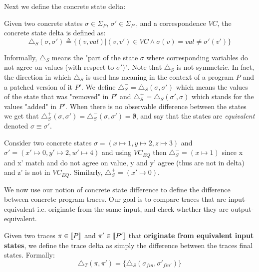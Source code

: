 Next we define the concrete state delta:
\begin{definition} 
Given two concrete states $\sigma \in \Sigma_{P}$, $\sigma' \in \Sigma_{P'}$, and a correspondence $VC$, the concrete state delta is defined as:
\[
\triangle_{S}(\sigma,\sigma') \triangleq \{ (v,val) | (v,v') \in VC \wedge \sigma(v) = val \neq \sigma'(v')\}
\]
\end{definition}
Informally, $\triangle_{S}$ means the "part of the state $\sigma$ where corresponding variables do not agree on values (with respect to $\sigma'$)". Note that $\triangle_{S}$ is not symmetric. In fact, the direction in which $\triangle_{S}$ is used has meaning in the context of a program $P$ and a patched version of it $P'$. We define $\triangle_{S}^{-} = \triangle_{S}(\sigma,\sigma')$ which means the values of the state that was "removed" in $P'$ and $\triangle_{S}^{+} = \triangle_{S}(\sigma',\sigma)$ which stands for the values "added" in $P'$. When there is no observable difference between the states we get that $\triangle_{S}^{+}(\sigma,\sigma')= \triangle_{S}^{-}(\sigma,\sigma') = \emptyset$, and say that the states are \emph{equivalent} denoted $\sigma \equiv \sigma'$.

\begin{Example}
Consider two concrete states $\sigma = (x \mapsto 1,y \mapsto 2,z \mapsto 3)$ and $\sigma' = (x' \mapsto 0,y' \mapsto 2,w' \mapsto 4)$ and using $VC_{EQ}$ then $\triangle_{S}^{-} = (x \mapsto 1)$ since x and x' match and do not agree on value, y and y' agree (thus are not in delta) and z' is not in $VC_{EQ}$. Similarly, $\triangle_{S}^{+} = (x' \mapsto 0)$. %
\end{Example}

We now use our notion of concrete state difference to define the difference between concrete program traces. Our goal is to compare traces that are input-equivalent i.e. originate from the same input, and check whether they are output-equivalent.

\begin{definition} Given two traces $\pi \in \lbrack\!\lbrack P \rbrack\!\rbrack$ and $\pi' \in \lbrack\!\lbrack P' \rbrack\!\rbrack$ that \textbf{originate from equivalent input states}, we define the trace delta as simply the difference between the traces final states. Formally:
\[
\triangle_{T}(\pi,\pi') = \{ \triangle_{S}(\sigma_{fin},\sigma'_{fin'}) \}
\]
\end{definition}

